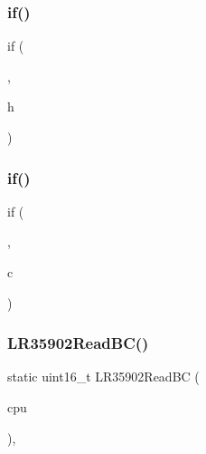 \mbox{\label{isa-lr35902_8c_a7f682ec46e1fbe8d2ad1b14c45485c6d}} 
\subsubsection{\texorpdfstring{if()}{if()}\hspace{0.1cm}{\footnotesize\ttfamily [1/2]}}
{\footnotesize\ttfamily if (\begin{DoxyParamCaption}\item[{(cpu-\/$>$\mbox{\hyperlink{isa-lr35902_8c_a7015284d2957ab7cdf82d2535a2fa547}{a}} \&0x\+F)}]{,  }\item[{0x9$\vert$$\vert$cpu-\/$>$f.}]{h }\end{DoxyParamCaption})}

\mbox{\label{isa-lr35902_8c_a2eb27369cb3dbac14564f95cd51effdf}} 
\subsubsection{\texorpdfstring{if()}{if()}\hspace{0.1cm}{\footnotesize\ttfamily [2/2]}}
{\footnotesize\ttfamily if (\begin{DoxyParamCaption}\item[{(\mbox{\hyperlink{isa-lr35902_8c_a7015284d2957ab7cdf82d2535a2fa547}{a}} \&0x1\+F0)}]{,  }\item[{0x90$\vert$$\vert$cpu-\/$>$f.}]{c }\end{DoxyParamCaption})}

\mbox{\label{isa-lr35902_8c_a9592cbd56d4f66bab66a74e70a335023}} 
\subsubsection{\texorpdfstring{L\+R35902\+Read\+B\+C()}{LR35902ReadBC()}}
{\footnotesize\ttfamily static uint16\+\_\+t L\+R35902\+Read\+BC (\begin{DoxyParamCaption}\item[{struct L\+R35902\+Core $\ast$}]{cpu }\end{DoxyParamCaption})\hspace{0.3cm}{\ttfamily [inline]}, {\ttfamily [static]}}

